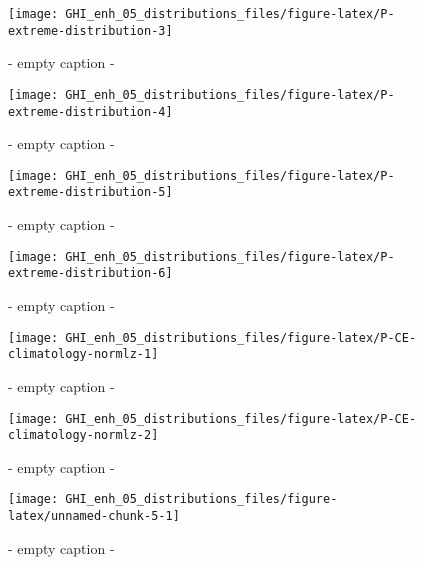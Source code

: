\documentclass[
  10pt,
  a4paper,oneside]{article}
\begin{document}
\begin{figure}[H]

{\centering \texttt{[image: GHI\_enh\_05\_distributions\_files/figure-latex/P-extreme-distribution-3]} 

}

\caption{ - empty caption - }\label{fig:P-extreme-distribution-3}
\end{figure}
\begin{figure}[H]

{\centering \texttt{[image: GHI\_enh\_05\_distributions\_files/figure-latex/P-extreme-distribution-4]} 

}

\caption{ - empty caption - }\label{fig:P-extreme-distribution-4}
\end{figure}
\begin{figure}[H]

{\centering \texttt{[image: GHI\_enh\_05\_distributions\_files/figure-latex/P-extreme-distribution-5]} 

}

\caption{ - empty caption - }\label{fig:P-extreme-distribution-5}
\end{figure}
\begin{figure}[H]

{\centering \texttt{[image: GHI\_enh\_05\_distributions\_files/figure-latex/P-extreme-distribution-6]} 

}

\caption{ - empty caption - }\label{fig:P-extreme-distribution-6}
\end{figure}
\begin{figure}[H]

{\centering \texttt{[image: GHI\_enh\_05\_distributions\_files/figure-latex/P-CE-climatology-normlz-1]} 

}

\caption{ - empty caption - }\label{fig:P-CE-climatology-normlz-1}
\end{figure}
\begin{figure}[H]

{\centering \texttt{[image: GHI\_enh\_05\_distributions\_files/figure-latex/P-CE-climatology-normlz-2]} 

}

\caption{ - empty caption - }\label{fig:P-CE-climatology-normlz-2}
\end{figure}
\begin{figure}[H]

{\centering \texttt{[image: GHI\_enh\_05\_distributions\_files/figure-latex/unnamed-chunk-5-1]} 

}

\caption{ - empty caption - }\label{fig:unnamed-chunk-5-1}
\end{figure}
\end{document}
